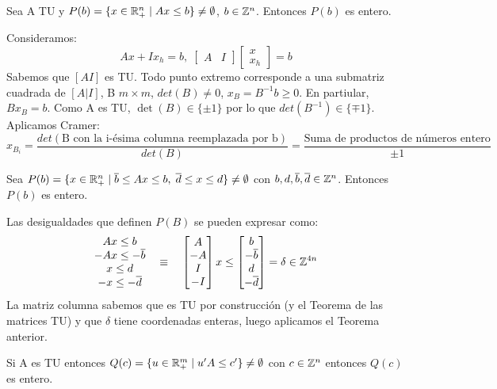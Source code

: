 \documentclass[PM.tex]{subfiles}
\begin{document}
\begin{theorem}
Sea A TU y $P(b)=\{x \in \mathbb{R}^n_+ \mid Ax\leq b\} \neq \emptyset$, $b\in \mathbb{Z}^n$. Entonces $P(b)$ es entero.
\end{theorem}
\begin{dem}Consideramos:
\[
Ax +Ix_h = b, \; \begin{bmatrix} A & I \end{bmatrix} \begin{bmatrix}
x\\
x_h
\end{bmatrix} = b
\]
Sabemos que $[A I]$ es TU. Todo punto extremo corresponde a una submatriz cuadrada de $[A | I]$, B $m\times m$, $det(B)\neq 0$, $x_B=B^{-1}b\geq 0$. En partiular, $B x_B = b$. Como A es TU, $\det(B)\in\{\pm1\}$ por lo que $det(B^{-1})\in\{\mp1\}$. Aplicamos Cramer:
\[
x_{B_i}=\frac{det(\text{B con la i-ésima columna reemplazada por b})}{det(B)}=\frac{\text{Suma de productos de números entero}}{\pm1}
\]\QED
\end{dem}
\begin{coro} Sea $P(b)=\{x \in \mathbb{R}^n_+ \mid \overline{b}\leq Ax\leq b,\; \overline{d}\leq x \leq d\} \neq \emptyset$ con $b,d,\overline{b},\overline{d}\in\mathbb{Z}^n$. Entonces $P(b)$ es entero.
\end{coro}
\begin{dem}
Las desigualdades que definen $P(B)$ se pueden expresar como:
\[
\begin{matrix}
Ax \leq b\\
-Ax\leq -\overline{b}\\
x\leq d\\
-x\leq -\overline{d}
\end{matrix}\quad
\equiv\quad
\begin{bmatrix}
A\\
-A\\
I\\
-I
\end{bmatrix}
x\leq
\begin{bmatrix}
b\\
-\overline{b}\\
d\\
-\overline{d}
\end{bmatrix} = \delta \in \mathbb{Z}^{4n}
\]
La matriz columna sabemos que es TU por construcción (y el Teorema de las matrices TU) y que $\delta$ tiene coordenadas enteras, luego aplicamos el Teorema anterior.\QED
\end{dem}
\begin{coro}
Si A es TU entonces $Q(c) = \{u\in\mathbb{R}^m_+ \mid u'A\leq c'\}\neq\emptyset$ con $c\in\mathbb{Z}^n$ entonces $Q(c)$ es entero.
\end{coro}
\end{document}
